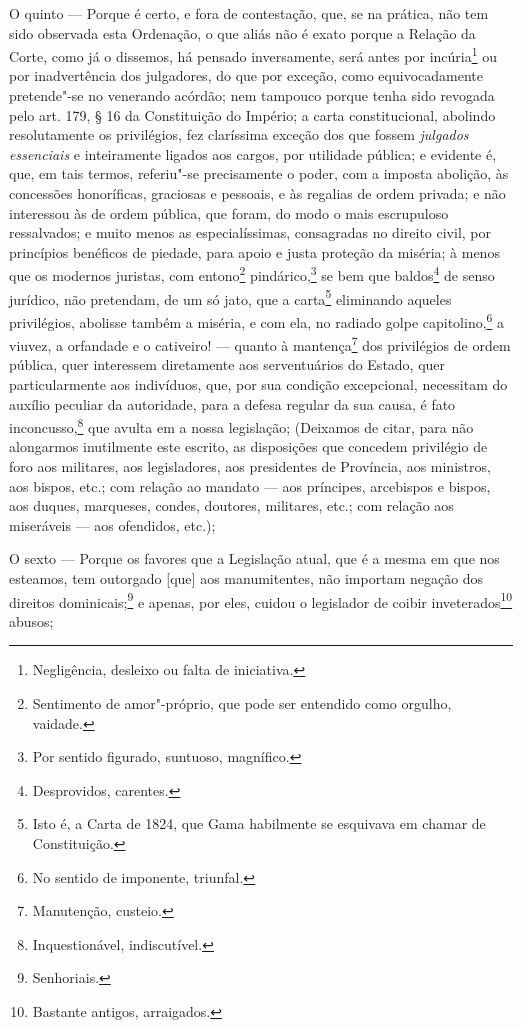 O quinto --- Porque é certo, e fora de contestação, que, se na prática,
não tem sido observada esta Ordenação, o que aliás não é exato porque a
Relação da Corte, como já o dissemos, há pensado inversamente, será
antes por incúria\footnote{Negligência, desleixo ou falta de
  iniciativa.} ou por inadvertência dos julgadores, do que por exceção,
como equivocadamente pretende"-se no venerando acórdão; nem tampouco
porque tenha sido revogada pelo art. 179, § 16 da Constituição do
Império; a carta constitucional, abolindo resolutamente os privilégios,
fez claríssima exceção dos que fossem \emph{julgados essenciais} e
inteiramente ligados aos cargos, por utilidade pública; e evidente é,
que, em tais termos, referiu"-se precisamente o poder, com a imposta
abolição, às concessões honoríficas, graciosas e pessoais, e às regalias
de ordem privada; e não interessou às de ordem pública, que foram, do
modo o mais escrupuloso ressalvados; e muito menos as especialíssimas,
consagradas no direito civil, por princípios benéficos de piedade, para
apoio e justa proteção da miséria; à menos que os modernos juristas, com
entono\footnote{Sentimento de amor"-próprio, que pode ser entendido
  como orgulho, vaidade.} pindárico,\footnote{Por sentido figurado,
  suntuoso, magnífico.} se bem que baldos\footnote{Desprovidos,
  carentes.} de senso jurídico, não pretendam, de um só jato, que a
carta\footnote{Isto é, a Carta de 1824, que Gama habilmente se
  esquivava em chamar de Constituição.} eliminando aqueles privilégios,
abolisse também a miséria, e com ela, no radiado golpe
capitolino,\footnote{No sentido de imponente, triunfal.} a viuvez, a
orfandade e o cativeiro! --- quanto à mantença\footnote{Manutenção,
  custeio.} dos privilégios de ordem pública, quer interessem
diretamente aos serventuários do Estado, quer particularmente aos
indivíduos, que, por sua condição excepcional, necessitam do auxílio
peculiar da autoridade, para a defesa regular da sua causa, é fato
inconcusso,\footnote{Inquestionável, indiscutível.} que avulta em a
nossa legislação; (Deixamos de citar, para não alongarmos inutilmente
este escrito, as disposições que concedem privilégio de foro aos
militares, aos legisladores, aos presidentes de Província, aos
ministros, aos bispos, etc.; com relação ao mandato --- aos príncipes,
arcebispos e bispos, aos duques, marqueses, condes, doutores, militares,
etc.; com relação aos miseráveis --- aos ofendidos, etc.);

O sexto --- Porque os favores que a Legislação atual, que é a mesma em
que nos esteamos, tem outorgado {[}que{]} aos manumitentes, não importam
negação dos direitos dominicais;\footnote{Senhoriais.} e apenas, por
eles, cuidou o legislador de coibir inveterados\footnote{Bastante
  antigos, arraigados.} abusos;

